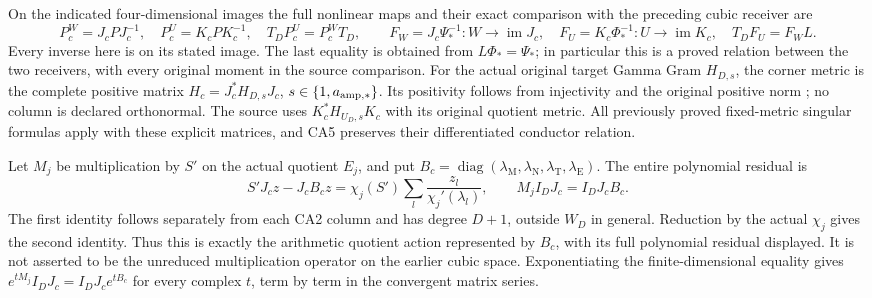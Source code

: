 \documentclass[11pt]{article}
\begin{document}
On the indicated four-dimensional images the full nonlinear maps
and their exact comparison with the preceding cubic receiver are
\[
 P_c^W=J_cPJ_c^{-1},\quad P_c^U=K_cPK_c^{-1},\quad
 T_DP_c^U=P_c^WT_D,\qquad
 F_W=J_c\Psi_*^{-1}:W\to\operatorname{im}J_c,\quad
 F_U=K_c\Phi_*^{-1}:U\to\operatorname{im}K_c,
 \quad T_DF_U=F_WL. \tag{CA5}
\]
Every inverse here is on its stated image. The last equality is
obtained from $L\Phi_*=\Psi_*$; in particular this is a proved
relation between the two receivers, with every original moment
in the source comparison.
For the actual original target Gamma Gram $H_{D,s}$, the corner
metric is the complete positive matrix
$H_c=J_c^*H_{D,s}J_c$, $s\in\{1,a_{\rm amp,*}\}$.
Its positivity follows from injectivity and the original positive
norm \cite{WCF}; no column is declared orthonormal.
The source uses $K_c^*H_{U_D,s}K_c$ with its original quotient
metric. All previously proved fixed-metric singular formulas apply
with these explicit matrices, and CA5 preserves their differentiated
conductor relation.

Let $M_j$ be multiplication by $S'$ on the actual quotient $E_j$,
and put $B_c=\operatorname{diag}(\lambda_\mathrm M,
\lambda_\mathrm N,\lambda_\mathrm T,\lambda_\mathrm E)$.
The entire polynomial residual is
\[
 S'J_cz-J_cB_cz
 =\chi_j(S')\sum_l\frac{z_l}{\chi_j'(\lambda_l)},\qquad
 M_j I_DJ_c=I_DJ_c B_c. \tag{CA6}
\]
The first identity follows separately from each CA2 column and
has degree $D+1$, outside $W_D$ in general. Reduction by the
actual $\chi_j$ gives the second identity. Thus this is exactly
the arithmetic quotient action represented by $B_c$, with its
full polynomial residual displayed. It is not asserted to be the
unreduced multiplication operator on the earlier cubic space.
Exponentiating the finite-dimensional equality gives
$e^{tM_j}I_DJ_c=I_DJ_c e^{tB_c}$ for every complex $t$, term
by term in the convergent matrix series.
\end{document}
